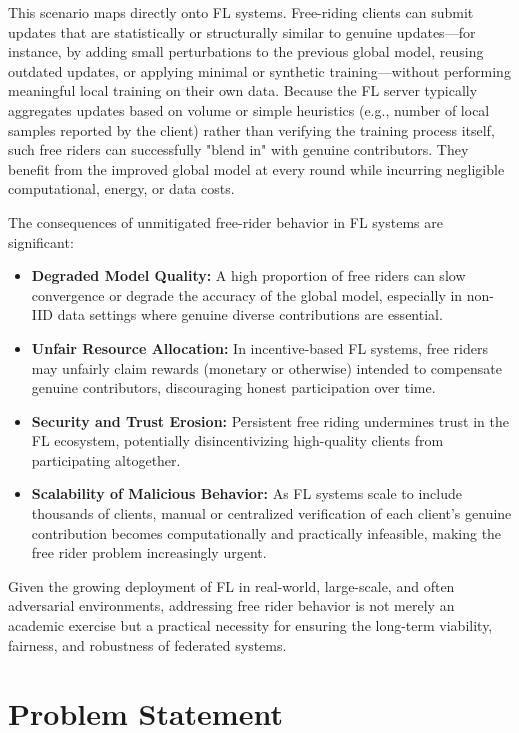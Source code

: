 This scenario maps directly onto FL systems. Free-riding clients can submit updates that are statistically or structurally similar to genuine updates—for instance, by adding small perturbations to the previous global model, reusing outdated updates, or applying minimal or synthetic training—without performing meaningful local training on their own data. Because the FL server typically aggregates updates based on volume or simple heuristics (e.g., number of local samples reported by the client) rather than verifying the training process itself, such free riders can successfully "blend in" with genuine contributors. They benefit from the improved global model at every round while incurring negligible computational, energy, or data costs.

The consequences of unmitigated free-rider behavior in FL systems are significant:

\begin{itemize}
    \item \textbf{Degraded Model Quality:} A high proportion of free riders can slow convergence or degrade the accuracy of the global model, especially in non-IID data settings where genuine diverse contributions are essential.
    \item \textbf{Unfair Resource Allocation:} In incentive-based FL systems, free riders may unfairly claim rewards (monetary or otherwise) intended to compensate genuine contributors, discouraging honest participation over time.
    \item \textbf{Security and Trust Erosion:} Persistent free riding undermines trust in the FL ecosystem, potentially disincentivizing high-quality clients from participating altogether.
    \item \textbf{Scalability of Malicious Behavior:} As FL systems scale to include thousands of clients, manual or centralized verification of each client's genuine contribution becomes computationally and practically infeasible, making the free rider problem increasingly urgent.
\end{itemize}

Given the growing deployment of FL in real-world, large-scale, and often adversarial environments, addressing free rider behavior is not merely an academic exercise but a practical necessity for ensuring the long-term viability, fairness, and robustness of federated systems.


\section{Problem Statement}
\label{sec:problem-statement}


